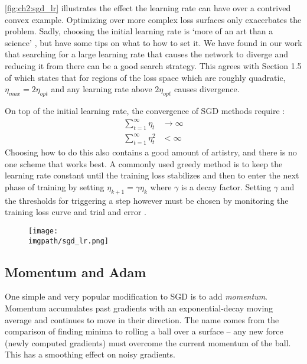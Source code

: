 \autoref{fig:ch2:sgd_lr} illustrates the effect the learning rate can have over
a contrived convex example. Optimizing over more complex loss surfaces only
exacerbates the problem. Sadly, choosing the initial learning rate is 
`more of an art than a science' \cite{goodfellow_deep_2016}, but
\cite{bottou_stochastic_2012-1, montavon_neural_2012} have some tips on what to
how to set it. We have found in our work that searching for a large learning 
rate that causes the network to diverge and reducing it from there can be a good
search strategy. This agrees with Section 1.5 of \cite{lecun_efficient_2012}
which states that for regions of the loss space which are roughly quadratic,
$\eta_{max} = 2\eta_{opt}$ and any learning rate above $2\eta_{opt}$ causes
divergence.

On top of the initial learning rate, the convergence of SGD methods require 
\cite{bottou_stochastic_2012-1}:
\begin{align}
  \sum_{t=1}^{\infty} \eta_t &\rightarrow \infty \\
  \sum_{t=1}^{\infty} \eta_t^2 &< \infty 
\end{align}
Choosing how to do this also contains a good amount of artistry,
and there is no one scheme that works best. A commonly used greedy method is to
keep the learning rate constant until the training loss stabilizes and then to
enter the next phase of training by setting $\eta_{k+1} = \gamma \eta_{k}$ where
$\gamma$ is a decay factor. Setting $\gamma$ and the thresholds for triggering
a step however must be chosen by monitoring the training loss curve and trial
and error \cite{bottou_stochastic_2012-1}.

\begin{figure}[t]
  \centering
  \texttt{[image: \\imgpath/sgd\_lr.png]}
  \label{fig:ch2:sgd_lr}
\end{figure}

\subsection{Momentum and Adam}
One simple and very popular modification to SGD is to add \emph{momentum}.
Momentum accumulates past gradients with an exponential-decay moving average and
continues to move in their direction. The name comes from the comparison of finding
minima to rolling a ball over a surface --
any new force (newly computed gradients) must overcome the current momentum of 
the ball. This has a smoothing effect on noisy gradients. 

